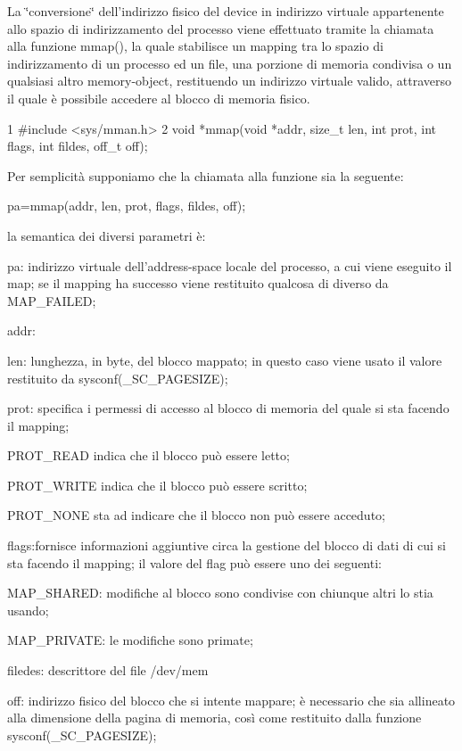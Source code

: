 La \char`\"{}conversione\char`\"{} dell'indirizzo fisico del device in indirizzo virtuale appartenente allo spazio di indirizzamento del processo viene effettuato tramite la chiamata alla funzione mmap(), la quale stabilisce un mapping tra lo spazio di indirizzamento di un processo ed un file, una porzione di memoria condivisa o un qualsiasi altro memory-\/object, restituendo un indirizzo virtuale valido, attraverso il quale è possibile accedere al blocco di memoria fisico. 
\begin{DoxyCode}
1 #include <sys/mman.h>
2 void *mmap(void *addr, size\_t len, int prot, int flags, int fildes, off\_t off);
\end{DoxyCode}
 Per semplicità supponiamo che la chiamata alla funzione sia la seguente\+: \begin{center}pa=mmap(addr, len, prot, flags, fildes, off);\end{center}  la semantica dei diversi parametri è\+:
\begin{DoxyItemize}
\item pa\+: indirizzo virtuale dell'address-\/space locale del processo, a cui viene eseguito il map; se il mapping ha successo viene restituito qualcosa di diverso da M\+A\+P\+\_\+\+F\+A\+I\+L\+E\+D;
\item addr\+:
\item len\+: lunghezza, in byte, del blocco mappato; in questo caso viene usato il valore restituito da sysconf(\+\_\+\+S\+C\+\_\+\+P\+A\+G\+E\+S\+I\+Z\+E);
\item prot\+: specifica i permessi di accesso al blocco di memoria del quale si sta facendo il mapping;
\begin{DoxyItemize}
\item P\+R\+O\+T\+\_\+\+R\+E\+A\+D indica che il blocco può essere letto;
\item P\+R\+O\+T\+\_\+\+W\+R\+I\+T\+E indica che il blocco può essere scritto;
\item P\+R\+O\+T\+\_\+\+N\+O\+N\+E sta ad indicare che il blocco non può essere acceduto;
\end{DoxyItemize}
\item flags\+:fornisce informazioni aggiuntive circa la gestione del blocco di dati di cui si sta facendo il mapping; il valore del flag può essere uno dei seguenti\+:
\begin{DoxyItemize}
\item M\+A\+P\+\_\+\+S\+H\+A\+R\+E\+D\+: modifiche al blocco sono condivise con chiunque altri lo stia usando;
\item M\+A\+P\+\_\+\+P\+R\+I\+V\+A\+T\+E\+: le modifiche sono primate;
\end{DoxyItemize}
\end{DoxyItemize}
\begin{DoxyItemize}
\item filedes\+: descrittore del file /dev/mem
\item off\+: indirizzo fisico del blocco che si intente mappare; è necessario che sia allineato alla dimensione della pagina di memoria, così come restituito dalla funzione sysconf(\+\_\+\+S\+C\+\_\+\+P\+A\+G\+E\+S\+I\+Z\+E);
\end{DoxyItemize}

